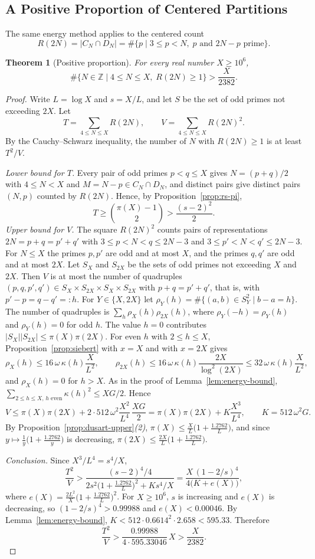 \documentclass[11pt]{amsart}
\newtheorem{Theorem}{Theorem}[section]
\theoremstyle{definition}
\theoremstyle{remark}
\begin{document}
\subsection{A Positive Proportion of Centered Partitions}\label{subsec:positive-proportion}
The same energy method applies to the centered count
\[
R(2N)=|C_N\cap D_N|=\#\{p\mid 3\leq p<N,\; p \text{ and } 2N-p \text{ prime}\}.
\]
\begin{Theorem}[Positive proportion]\label{thm:positive-proportion}
For every real number $X\geq 10^6$,
\[
\#\{N\in\mathbb Z\mid 4\leq N\leq X,\; R(2N)\geq 1\}>\frac{X}{2382}.
\]
\end{Theorem}
\begin{proof}
Write $L=\log X$ and $s=X/L$, and let $S$ be the set of odd primes not exceeding $2X$. Let
\[
T=\sum_{4\leq N\leq X}R(2N),\qquad V=\sum_{4\leq N\leq X}R(2N)^2.
\]
By the Cauchy--Schwarz inequality, the number of $N$ with $R(2N)\geq 1$ is at least $T^2/V$.

\emph{Lower bound for $T$.} Every pair of odd primes $p<q\leq X$ gives $N=(p+q)/2$ with $4\leq N<X$ and $M=N-p\in C_N\cap D_N$, and distinct pairs give distinct pairs $(N,p)$ counted by $R(2N)$. Hence, by Proposition~\ref{prop:rs-pi},
\[
T\geq\binom{\pi(X)-1}{2}>\frac{(s-2)^2}{2}.
\]
\emph{Upper bound for $V$.} The square $R(2N)^2$ counts pairs of representations $2N=p+q=p'+q'$ with $3\leq p<N<q\leq 2N-3$ and $3\leq p'<N<q'\leq 2N-3$. For $N\leq X$ the primes $p,p'$ are odd and at most $X$, and the primes $q,q'$ are odd and at most $2X$. Let $S_X$ and $S_{2X}$ be the sets of odd primes not exceeding $X$ and $2X$. Then $V$ is at most the number of quadruples $(p,q,p',q')\in S_X\times S_{2X}\times S_X\times S_{2X}$ with $p+q=p'+q'$, that is, with $p'-p=q-q'=:h$. For $Y\in\{X,2X\}$ let $\rho_Y(h)=\#\{(a,b)\in S_Y^2\mid b-a=h\}$. The number of quadruples is $\sum_h\rho_X(h)\rho_{2X}(h)$, where $\rho_Y(-h)=\rho_Y(h)$ and $\rho_Y(h)=0$ for odd $h$. The value $h=0$ contributes $|S_X||S_{2X}|\leq\pi(X)\pi(2X)$. For even $h$ with $2\leq h\leq X$, Proposition~\ref{prop:siebert} with $x=X$ and with $x=2X$ gives
\[
\rho_X(h)\leq 16\,\omega\,\kappa(h)\frac{X}{L^2},\qquad
\rho_{2X}(h)\leq 16\,\omega\,\kappa(h)\frac{2X}{\log^2(2X)}\leq 32\,\omega\,\kappa(h)\frac{X}{L^2},
\]
and $\rho_X(h)=0$ for $h>X$. As in the proof of Lemma~\ref{lem:energy-bound}, $\sum_{2\leq h\leq X,\,h \text{ even}}\kappa(h)^2\leq XG/2$. Hence
\[
V\leq \pi(X)\pi(2X)+2\cdot 512\,\omega^2\frac{X^2}{L^4}\,\frac{XG}{2}=\pi(X)\pi(2X)+K\frac{X^3}{L^4},\qquad K=512\,\omega^2 G.
\]
By Proposition~\ref{prop:dusart-upper}\emph{(2)}, $\pi(X)\leq \frac{X}{L}\bigl(1+\frac{1.2762}{L}\bigr)$, and since $y\mapsto \frac1y\bigl(1+\frac{1.2762}{y}\bigr)$ is decreasing, $\pi(2X)\leq \frac{2X}{L}\bigl(1+\frac{1.2762}{L}\bigr)$.

\emph{Conclusion.} Since $X^3/L^4=s^4/X$,
\[
\frac{T^2}{V}>\frac{(s-2)^4/4}{2s^2\bigl(1+\frac{1.2762}{L}\bigr)^2+K s^4/X}=\frac{X\,(1-2/s)^4}{4\bigl(K+e(X)\bigr)},
\]
where $e(X)=\frac{2L^2}{X}\bigl(1+\frac{1.2762}{L}\bigr)^2$.
For $X\geq 10^6$, $s$ is increasing and $e(X)$ is decreasing, so $(1-2/s)^4>0.99988$ and $e(X)<0.00046$. By Lemma~\ref{lem:energy-bound}, $K<512\cdot 0.6614^2\cdot 2.658<595.33$. Therefore
\[
\frac{T^2}{V}>\frac{0.99988}{4\cdot 595.33046}\,X>\frac{X}{2382}.
\]
\end{proof}
\end{document}
